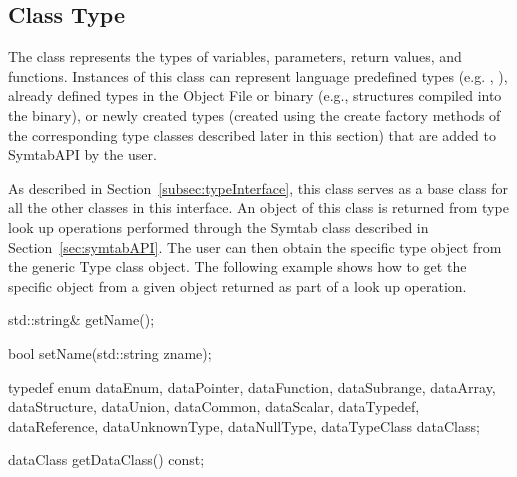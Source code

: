 \subsection{Class Type}


The class  represents the types of variables, parameters, return values, and functions. Instances of this class can represent language predefined types (e.g. , ), already defined types in the Object File or binary (e.g., structures compiled into the binary), or newly created types (created using the create factory methods of the corresponding type classes described later in this section) that are added to SymtabAPI by the user.

As described in Section~\ref{subsec:typeInterface}, this class serves as a base class for all the other classes in this interface. An object of this class is returned from type look up operations performed through the Symtab class described in Section~\ref{sec:symtabAPI}. The user can then obtain the specific type object from the generic Type class object. The following example shows how to get the specific object from a given  object returned as part of a look up operation.



\begin{apient}
std::string& getName();
\end{apient}

\begin{apient}
bool setName(std::string zname);
\end{apient}

\begin{apient}
typedef enum{
    dataEnum,
    dataPointer,
    dataFunction,
    dataSubrange,
    dataArray,
    dataStructure,
    dataUnion,
    dataCommon,
    dataScalar,
    dataTypedef,
    dataReference,
    dataUnknownType,
    dataNullType,
    dataTypeClass
} dataClass;
\end{apient}

\begin{apient}
dataClass getDataClass() const;
\end{apient}

